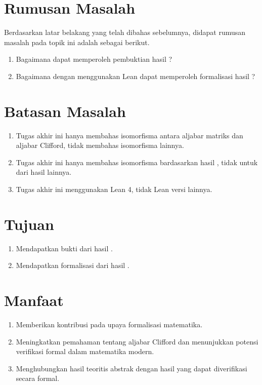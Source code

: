 \section{Rumusan Masalah}

Berdasarkan latar belakang yang telah dibahas sebelumnya, didapat rumusan masalah pada topik ini adalah sebagai berikut.

\begin{enumerate} %
    \item Bagaimana dapat memperoleh pembuktian hasil \icm{}?
    \item Bagaimana dengan menggunakan Lean dapat memperoleh formalisasi hasil \icm{}?
\end{enumerate}

\section{Batasan Masalah}

\begin{enumerate}
    \item Tugas akhir ini hanya membahas isomorfisma antara aljabar matriks dan aljabar Clifford, tidak membahas isomorfisma lainnya.
    \item Tugas akhir ini hanya membahas isomorfisma bardasarkan hasil \icm{}, tidak untuk dari hasil lainnya.
    \item Tugas akhir ini menggunakan Lean 4, tidak Lean versi lainnya.
\end{enumerate}

\section{Tujuan}

\begin{enumerate}
    \item Mendapatkan bukti dari hasil \icm{}.
    \item Mendapatkan formalisasi dari hasil \icm{}.
\end{enumerate}

\section{Manfaat}

\begin{enumerate}
    \item Memberikan kontribusi pada upaya formalisasi matematika.
    \item Meningkatkan pemahaman tentang aljabar Clifford dan menunjukkan potensi verifikasi formal dalam matematika modern.
    \item Menghubungkan hasil teoritis abstrak dengan hasil yang dapat diverifikasi secara formal.
\end{enumerate}
